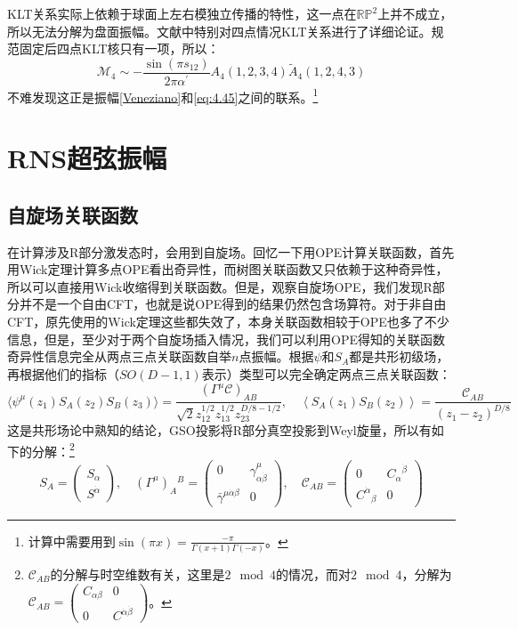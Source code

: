 KLT关系实际上依赖于球面上左右模独立传播的特性，这一点在$\mathbb{RP}^2$上并不成立，所以无法分解为盘面振幅\cite{dyj}。文献\cite{Kawai:1985xq}中特别对四点情况KLT关系进行了详细论证。规范固定后四点KLT核只有一项，所以：
\begin{equation}
	\mathcal{M}_4 \sim-\frac{\sin(\pi s_{12})}{2\pi\alpha^{\prime}}A_4(1,2,3,4)\tilde A_4(1,2,4,3)
\end{equation}
不难发现这正是振幅\ref{Veneziano}和\ref{eq:4.45}之间的联系。\footnote{计算中需要用到$\sin(\pi x) = \frac{-\pi}{\Gamma(x+1)\Gamma(-x)}$。}
\section{RNS超弦振幅}
\subsection{自旋场关联函数}
在计算涉及R部分激发态时，会用到自旋场。回忆一下用OPE计算关联函数，首先用Wick定理计算多点OPE看出奇异性，而树图关联函数又只依赖于这种奇异性，所以可以直接用Wick收缩得到关联函数。但是，观察自旋场OPE，我们发现R部分并不是一个自由CFT，也就是说OPE得到的结果仍然包含场算符。对于非自由CFT，原先使用的Wick定理这些都失效了，本身关联函数相较于OPE也多了不少信息，但是，至少对于两个自旋场插入情况，我们可以利用OPE得知的关联函数奇异性信息完全从两点三点关联函数自举$n$点振幅。根据$\psi$和$S_A$都是共形初级场，再根据他们的指标（$SO(D-1,1)$表示）类型可以完全确定两点三点关联函数：
\begin{equation}
	\label{eq:4.61}
	\langle\psi^\mu(z_1)S_A(z_2)S_B(z_3)\rangle=\frac{(\Gamma^\mu\mathcal{C})_{AB}}{\sqrt{2}z_{12}^{1/2}z_{13}^{1/2}z_{23}^{D/8-1/2}},\quad \left\langle{S_{A}(z_1)S_{B}(z_2)}\right\rangle=\frac{\mathcal{C}_{AB}}{(z_1-z_2)^{D/8}}
\end{equation}
这是共形场论中熟知的结论，GSO投影将R部分真空投影到Weyl旋量，所以有如下的分解：\footnote{$\mathcal{C}_{AB}$的分解与时空维数有关，这里是$2\mod 4$的情况，而对$2\mod 4$，分解为$\mathcal{C}_{AB}=\begin{pmatrix}C_{\alpha\beta}&0\\0&C^{\dot{\alpha}\dot{\beta}}\end{pmatrix}$。}
\begin{equation}
	\label{eq:4.65}
	S_A=\begin{pmatrix}S_\alpha\\S^{\dot{\alpha}}\end{pmatrix},\quad(\Gamma^\mu)_A{}^B=\begin{pmatrix}0&\gamma_{\alpha\dot{\beta}}^\mu\\\bar{\gamma}^{\mu\dot{\alpha}\beta}&0\end{pmatrix},\quad \mathcal{C}_{AB}=\begin{pmatrix}0&{C_{\alpha}}^{\dot{\beta}}\\{C^{\dot{\alpha}}}_{\beta}&0\end{pmatrix}
\end{equation}
